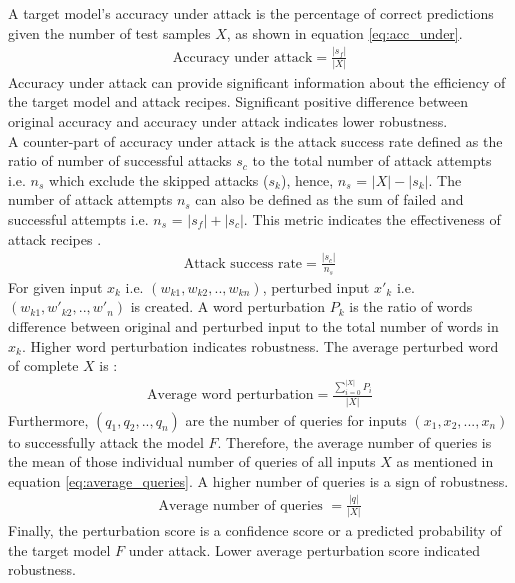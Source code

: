 \documentclass[%
	BCOR=8mm, %
	DIV=12,
	toc=bibliography, %
	toc=listof, %
	oneside, %
	egregdoesnotlikesansseriftitles, %
	]{scrbook}
\begin{document}
A target model's accuracy under attack is the percentage of correct predictions given the number of test samples $X$, as shown in equation \ref{eq:acc_under}. 
 \begin{equation}
    \begin{aligned}
        \mbox{Accuracy under attack}=\frac{|s_{f}|}{|X|}
        \label{eq:acc_under}
    \end{aligned}
\end{equation}
Accuracy under attack can provide significant information about the efficiency of the target model and attack recipes. Significant positive difference between original accuracy and accuracy under attack  indicates lower robustness.\\A counter-part of accuracy under attack is the attack success rate defined as the ratio of number of successful attacks $s_{c}$ to the total number of attack attempts i.e. $n_{s}$ which exclude the skipped attacks ($s_{k}$), hence,  $n_{s}$ = ${|X|-|s_{k}|}$. The number of attack attempts $n_{s}$ can also be defined as the sum of failed and successful attempts i.e. $n_{s}$ = ${|s_{f}|+|s_{c}|}$. This metric  indicates the effectiveness of attack recipes .\\
 \begin{equation}
    \begin{aligned}
        \mbox{Attack success rate}=\frac{|s_{c}|}{n_{s}}
        \label{eq:attack_success_rate}
    \end{aligned}
\end{equation}
For given input $x_{k}$ i.e. $(w_{k1},w_{k2},..,w_{kn})$, perturbed input $x'_{k}$ i.e. $(w_{k1},w'_{k2},..,w'_{n})$ is created. A word perturbation $P_{k}$ is the ratio of words difference between original and perturbed input to the total number of words in $x_{k}$. Higher word perturbation indicates robustness. The average perturbed word of complete $X$ is :
 \begin{equation}
    \begin{aligned}
        \mbox{Average word perturbation}= \frac{\sum_{i=0}^{|X|} P_{i}} {|X|}
        \label{eq:attack_success_rate}
    \end{aligned}
\end{equation}
 Furthermore,  $(q_{1},q_{2},..,q_{n})$ are the number of queries for inputs $(x_{1},x_{2},...,x_{n})$ to successfully attack the model $F$. Therefore, the average number of queries is the mean of those individual number of queries of all inputs $X$ as mentioned in equation \ref{eq:average_queries}. A higher number of queries is a sign of robustness.\\
  \begin{equation}
     \begin{aligned}
         \mbox{Average number of queries }= \frac{|q|} {|X|}
         \label{eq:average_queries}
     \end{aligned}
 \end{equation}
Finally, the perturbation score is a confidence score or a predicted probability of the target model $F$ under attack. Lower average perturbation score indicated robustness. 
\end{document}
